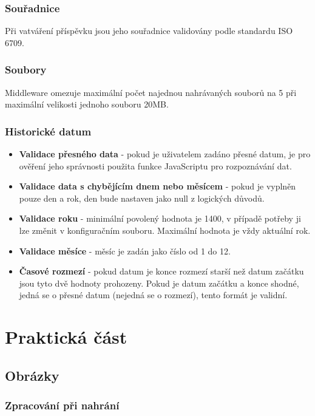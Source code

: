 \documentclass[12pt, a4paper,
 twoside,        %
 openright
]{report}
\begin{document}
\subsection{Souřadnice} Při vatváření příspěvku jsou jeho souřadnice validovány podle standardu ISO 6709.
\subsection{Soubory} Middleware omezuje maximální počet najednou nahrávaných souborů na 5 při maximální velikosti jednoho souboru 20MB.
\subsection{Historické datum}
    \begin{itemize}
        \item \textbf{Validace přesného data} - pokud je uživatelem zadáno přesné datum, je pro ověření jeho správnosti použita funkce JavaScriptu pro rozpoznávání dat.
        \item \textbf{Validace data s chybějícím dnem nebo měsícem} - pokud je vyplněn pouze den a rok, den bude nastaven jako null z logických důvodů. 
        \item \textbf{Validace roku} - minimální povolený hodnota je 1400, v případě potřeby ji lze změnit v konfiguračním souboru. Maximální hodnota je vždy aktuální rok.        
        \item \textbf{Validace měsíce} - měsíc je zadán jako číslo od 1 do 12.
        \item \textbf{Časové rozmezí} - pokud datum je konce rozmezí starší než datum začátku jsou tyto dvě hodnoty prohozeny. Pokud je datum začátku a konce shodné, jedná se o přesné datum (nejedná se o rozmezí), tento formát je validní.
    \end{itemize}


\chapter{Praktická část}


\section{Obrázky}
\subsection{Zpracování při nahrání}
\end{document}

